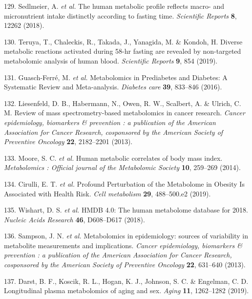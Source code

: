 \documentclass[11pt,twoside]{bristolthesis}
\begin{document}
\leavevmode\hypertarget{ref-Sedlmeier2018}{}%
129. Sedlmeier, A. \emph{et al.} The human metabolic profile reflects macro- and micronutrient intake distinctly according to fasting time. \emph{Scientific Reports} \textbf{8}, 12262 (2018).

\leavevmode\hypertarget{ref-Teruya2019}{}%
130. Teruya, T., Chaleckis, R., Takada, J., Yanagida, M. \& Kondoh, H. Diverse metabolic reactions activated during 58-hr fasting are revealed by non-targeted metabolomic analysis of human blood. \emph{Scientific Reports} \textbf{9}, 854 (2019).

\leavevmode\hypertarget{ref-Guasch-Ferre2016}{}%
131. Guasch-Ferré, M. \emph{et al.} Metabolomics in Prediabetes and Diabetes: A Systematic Review and Meta-analysis. \emph{Diabetes care} \textbf{39}, 833--846 (2016).

\leavevmode\hypertarget{ref-Liesenfeld2013}{}%
132. Liesenfeld, D. B., Habermann, N., Owen, R. W., Scalbert, A. \& Ulrich, C. M. Review of mass spectrometry-based metabolomics in cancer research. \emph{Cancer epidemiology, biomarkers \& prevention : a publication of the American Association for Cancer Research, cosponsored by the American Society of Preventive Oncology} \textbf{22}, 2182--2201 (2013).

\leavevmode\hypertarget{ref-Moore2014}{}%
133. Moore, S. C. \emph{et al.} Human metabolic correlates of body mass index. \emph{Metabolomics : Official journal of the Metabolomic Society} \textbf{10}, 259--269 (2014).

\leavevmode\hypertarget{ref-Cirulli2019}{}%
134. Cirulli, E. T. \emph{et al.} Profound Perturbation of the Metabolome in Obesity Is Associated with Health Risk. \emph{Cell metabolism} \textbf{29}, 488--500.e2 (2019).

\leavevmode\hypertarget{ref-Wishart2018}{}%
135. Wishart, D. S. \emph{et al.} HMDB 4.0: The human metabolome database for 2018. \emph{Nucleic Acids Research} \textbf{46}, D608--D617 (2018).

\leavevmode\hypertarget{ref-Sampson2013}{}%
136. Sampson, J. N. \emph{et al.} Metabolomics in epidemiology: sources of variability in metabolite measurements and implications. \emph{Cancer epidemiology, biomarkers \& prevention : a publication of the American Association for Cancer Research, cosponsored by the American Society of Preventive Oncology} \textbf{22}, 631--640 (2013).

\leavevmode\hypertarget{ref-Darst2019}{}%
137. Darst, B. F., Koscik, R. L., Hogan, K. J., Johnson, S. C. \& Engelman, C. D. Longitudinal plasma metabolomics of aging and sex. \emph{Aging} \textbf{11}, 1262--1282 (2019).
\end{document}
